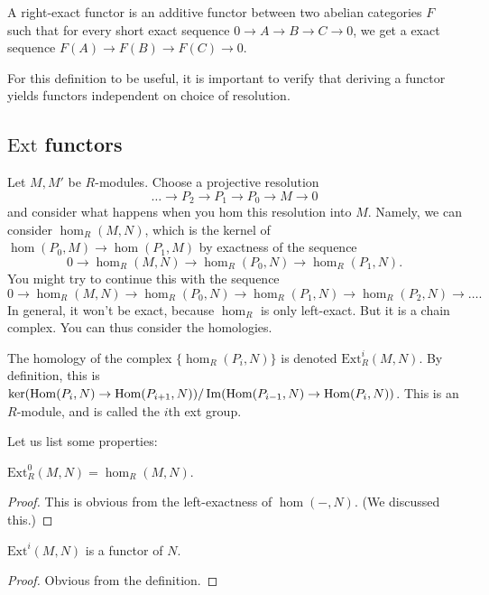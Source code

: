 \begin{definition} A right-exact functor is an additive functor
between two abelian categories $F$ such that for every short
exact sequence $0\rightarrow A\rightarrow B\rightarrow
C\rightarrow 0$, we get a exact sequence $F(A)\rightarrow
F(B)\rightarrow F(C)\rightarrow 0$.
\end{definition}

For this definition to be useful, it is important to verify that
deriving a functor yields functors independent on choice of
resolution.


\newcommand{\ext}{\mathrm{Ext}}
\subsection{$\ext$ functors}

Let $M, M'$ be $R$-modules. Choose a projective resolution 
\[ \dots \to P_2 \to P_1 \to P_0 \to M \to 0  \]
and consider what happens when you hom this resolution into $M$.
Namely, we can
consider $\hom_R(M,N)$, which is the kernel of $\hom(P_0, M) \to
\hom(P_1, M) $
by exactness of the sequence
\[ 0 \to \hom_R(M,N) \to \hom_R(P_0, N) \to \hom_R(P_1, N) . \]
You might try to continue this with the sequence
\[ 0 \to \hom_R(M,N) \to \hom_R(P_0, N) \to \hom_R(P_1, N) \to
\hom_R(P_2, N)
\to \dots. \]
In general, it won't be exact, because $\hom_R$ is only
left-exact. But it is a
chain complex. You can thus consider the homologies.

\begin{definition} 
The homology of the complex $\{\hom_R(P_i, N)\}$ is denoted
$\ext^i_R(M,N)$. By
definition, this is $\ker(\operatorname{Hom}(P_i,N) \to \operatorname{Hom}(P_{i+1},
N))/\operatorname{Im}(\operatorname{Hom}(P_{i-1},
N) \to \operatorname{Hom}(P_i,N))$. This is an $R$-module, and is called the
$i$th ext group.
\end{definition} 



Let us list some properties:

\begin{proposition} 
$\ext_R^0(M,N) = \hom_R(M,N)$. 
\end{proposition} 
\begin{proof} 
This is obvious from the left-exactness of $\hom(-,N)$. (We
discussed this.)
\end{proof} 

\begin{proposition} 
$\ext^i(M,N)$ is a functor of $N$.
\end{proposition} 
\begin{proof} 
Obvious from the definition.
\end{proof} 

